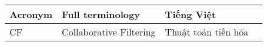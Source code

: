 \printglossary[type=\acronymtype,style=long]

\fontsize{12}{16}\selectfont

\begin{center}
\begin{tabular}{|l|l|l|l|}

\hline
\textbf{Acronym} & \textbf{Full terminology} & \textbf{Tiếng Việt} \\ \hline
    CF & Collaborative Filtering & Thuật toán tiến hóa\\ \hline

\end{tabular}    
\end{center}
\pagebreak